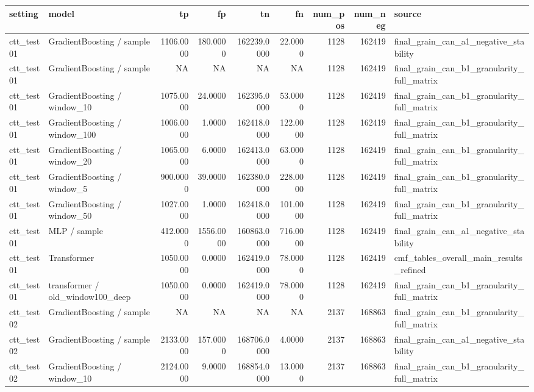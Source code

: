 \begin{tabular}{llrrrrrrl}
\toprule
setting & model & tp & fp & tn & fn & num\_pos & num\_neg & source \\
\midrule
ctt\_test01 & GradientBoosting / sample & 1106.0000 & 180.0000 & 162239.0000 & 22.0000 & 1128 & 162419 & final\_grain\_can\_a1\_negative\_stability \\
ctt\_test01 & GradientBoosting / sample & NA & NA & NA & NA & 1128 & 162419 & final\_grain\_can\_b1\_granularity\_full\_matrix \\
ctt\_test01 & GradientBoosting / window\_10 & 1075.0000 & 24.0000 & 162395.0000 & 53.0000 & 1128 & 162419 & final\_grain\_can\_b1\_granularity\_full\_matrix \\
ctt\_test01 & GradientBoosting / window\_100 & 1006.0000 & 1.0000 & 162418.0000 & 122.0000 & 1128 & 162419 & final\_grain\_can\_b1\_granularity\_full\_matrix \\
ctt\_test01 & GradientBoosting / window\_20 & 1065.0000 & 6.0000 & 162413.0000 & 63.0000 & 1128 & 162419 & final\_grain\_can\_b1\_granularity\_full\_matrix \\
ctt\_test01 & GradientBoosting / window\_5 & 900.0000 & 39.0000 & 162380.0000 & 228.0000 & 1128 & 162419 & final\_grain\_can\_b1\_granularity\_full\_matrix \\
ctt\_test01 & GradientBoosting / window\_50 & 1027.0000 & 1.0000 & 162418.0000 & 101.0000 & 1128 & 162419 & final\_grain\_can\_b1\_granularity\_full\_matrix \\
ctt\_test01 & MLP / sample & 412.0000 & 1556.0000 & 160863.0000 & 716.0000 & 1128 & 162419 & final\_grain\_can\_a1\_negative\_stability \\
ctt\_test01 & Transformer & 1050.0000 & 0.0000 & 162419.0000 & 78.0000 & 1128 & 162419 & cmf\_tables\_overall\_main\_results\_refined \\
ctt\_test01 & transformer / old\_window100\_deep & 1050.0000 & 0.0000 & 162419.0000 & 78.0000 & 1128 & 162419 & final\_grain\_can\_b1\_granularity\_full\_matrix \\
ctt\_test02 & GradientBoosting / sample & NA & NA & NA & NA & 2137 & 168863 & final\_grain\_can\_b1\_granularity\_full\_matrix \\
ctt\_test02 & GradientBoosting / sample & 2133.0000 & 157.0000 & 168706.0000 & 4.0000 & 2137 & 168863 & final\_grain\_can\_a1\_negative\_stability \\
ctt\_test02 & GradientBoosting / window\_10 & 2124.0000 & 9.0000 & 168854.0000 & 13.0000 & 2137 & 168863 & final\_grain\_can\_b1\_granularity\_full\_matrix \\

\end{tabular}
